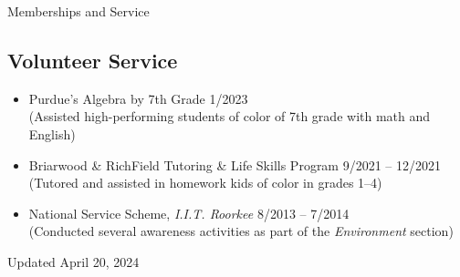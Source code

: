 \documentclass{CV} %
\begin{document}
\begin{rSection}{Memberships and Service}
    \subsection*{Volunteer Service}
    \begin{itemize}
        \item Purdue's Algebra by 7th Grade \hfill 1/2023
        \\ (Assisted high-performing students of color of 7th grade with math and English)
        \item Briarwood \& RichField Tutoring \& Life Skills Program \hfill 9/2021 – 12/2021
        \\ (Tutored and assisted in homework kids of color in grades 1–4)
        \item National Service Scheme, \textit{I.I.T. Roorkee} \hfill 8/2013 – 7/2014
        \\ (Conducted several awareness activities as part of the \textit{Environment} section)
    \end{itemize}

\end{rSection}

\vspace*{\fill}
\centering Updated April 20, 2024
\end{document}
